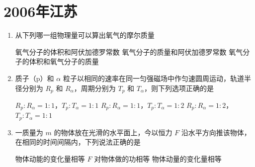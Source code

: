 \documentclass[\gkver]{gaokaozhenti}
\begin{document}
\chapter{2006年江苏}

\begin{enumerate}
\item
从下列哪一组物理量可以算出氧气的摩尔质量

{氧气分子的体积和阿伏加德罗常数}
{氧气分子的质量和阿伏加德罗常数}
{氧气分子的体积和氧气分子的质量}


\item
质子（p）和 $\alpha$ 粒子以相同的速率在同一匀强磁场中作匀速圆周运动，轨道半径分别为 $R_{p}$ 和 $R_{\alpha}$，周期分别为 $T_{p}$ 和 $T_{\alpha}$，则下列选项正确的是

{$R_{p}:R_{\alpha}=1:1$，$T_{p}:T_{\alpha}=1:1$}
{$R_{p}:R_{\alpha}=1:1$，$T_{p}:T_{\alpha}=1:2$}
{$R_{p}:R_{\alpha}=1:2$，$T_{p}:T_{\alpha}=1:1$}


\item
一质量为 $m$ 的物体放在光滑的水平面上，今以恒力 $F$ 沿水平方向推该物体，在相同的时间间隔内，下列说法正确的是

{物体动能的变化量相等}
{$F$ 对物体做的功相等}
{物体动量的变化量相等}


\end{enumerate}
\end{document}
